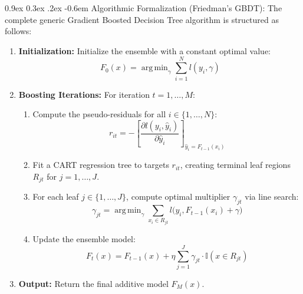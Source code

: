 \documentclass[11pt,a4paper]{article}
\makeatletter
\renewcommand\paragraph{\@startsection{paragraph}{4}{\z@}%
                                     {0.9ex \@plus0.3ex \@minus.2ex}%
                                     {-0.6em}%
                                     {\normalfont\normalsize\bfseries}}
\DeclareMathOperator*{\argmin}{arg\,min}
\makeatother
\begin{document}
\paragraph{Algorithmic Formalization (Friedman's GBDT):}
The complete generic Gradient Boosted Decision Tree algorithm is structured as follows:
\begin{enumerate}
    \item \textbf{Initialization:} Initialize the ensemble with a constant optimal value:
    \begin{equation}
        F_0(x) = \argmin_{\gamma} \sum_{i=1}^N l(y_i, \gamma)
    \end{equation}
    \item \textbf{Boosting Iterations:} For iteration $t = 1, \dots, M$:
    \begin{enumerate}
        \item Compute the pseudo-residuals for all $i \in \{1, \dots, N\}$:
        \begin{equation}
            r_{it} = -\left[ \frac{\partial l(y_i, \hat{y}_i)}{\partial \hat{y}_i} \right]_{\hat{y}_i = F_{t-1}(x_i)}
        \end{equation}
        \item Fit a CART regression tree to targets $r_{it}$, creating terminal leaf regions $R_{jt}$ for $j = 1, \dots, J$.
        \item For each leaf $j \in \{1, \dots, J\}$, compute optimal multiplier $\gamma_{jt}$ via line search:
        \begin{equation}
            \gamma_{jt} = \argmin_{\gamma} \sum_{x_i \in R_{jt}} l\big(y_i, F_{t-1}(x_i) + \gamma\big)
        \end{equation}
        \item Update the ensemble model:
        \begin{equation}
            F_t(x) = F_{t-1}(x) + \eta \sum_{j=1}^J \gamma_{jt} \cdot \mathbb{I}(x \in R_{jt})
        \end{equation}
    \end{enumerate}
    \item \textbf{Output:} Return the final additive model $F_M(x)$.
\end{enumerate}
\end{document}
